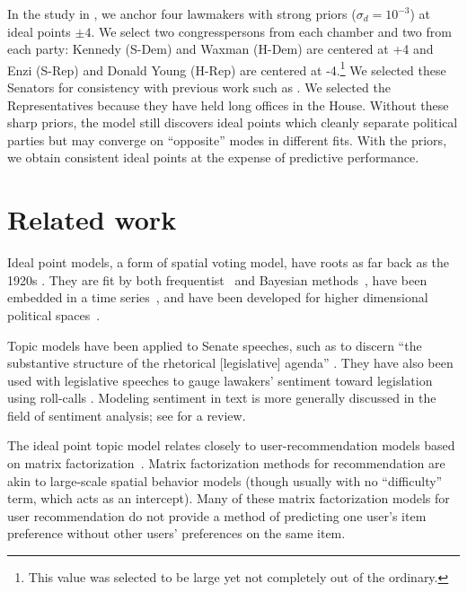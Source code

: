 In the study in , we anchor four lawmakers with
strong priors ($\sigma_d = 10^{-3}$) at ideal points $\pm 4$.  We
select two congresspersons from each chamber and two from each party:
Kennedy (S-Dem) and Waxman (H-Dem) are centered at +4 and Enzi (S-Rep)
and Donald Young (H-Rep) are centered at -4.\footnote{This value was
selected to be large yet not completely out of the ordinary.} We
selected these Senators for consistency with previous
work such as \cite{clinton:2004}.  We selected the Representatives because
they have held long offices in the House.  Without these sharp priors,
the model still discovers ideal points which cleanly separate
political parties but may converge on ``opposite'' modes in different
fits.  With the priors, we obtain consistent ideal points at the
expense of predictive performance.

\section*{Related work}


Ideal point models, a form of spatial voting model, have roots as far
back as the 1920s \citep{enelow:1984}. They are fit by both
frequentist~\citep{poole:1985,heckman:1996} and Bayesian
methods~\citep{jackman:2001,martin:2002,clinton:2004}, have been
embedded in a time series~\citep{martin:2002,wang:2010}, and have been
developed for higher dimensional political
spaces~\citep{jackman:2001,heckman:1996}.

\nocite{johnson:1999ch6}

Topic models have been applied to Senate speeches, such as to discern
``the substantive structure of the rhetorical [legislative] agenda''
\citep{quinn:2006}.  They have also been used with legislative speeches
to gauge lawakers' sentiment toward legislation using roll-calls
\citep{thomas:2006}.  Modeling sentiment in text is more generally
discussed in the field of sentiment analysis; see \cite{pang:2008} for a review.


The ideal point topic model relates closely to user-recommendation
models based on matrix factorization~\citep{salakhutdinov:2008a}.
Matrix factorization methods for recommendation are akin to
large-scale spatial behavior models (though usually with no
``difficulty'' term, which acts as an intercept).  Many of these
matrix factorization models for user recommendation do not provide a
method of predicting one user's item preference without other users'
preferences on the same item.

